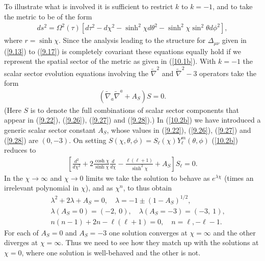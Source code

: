 \documentclass[aps,onecolumn,10pt]{revtex4}
\numberwithin{equation}{section}
\numberwithin{equation}{section}
\begin{document}
To illustrate what is involved it is sufficient to restrict $k$ to $k=-1$, and to take the metric to be of the form 
%
\begin{eqnarray}
ds^2=\Omega^2(\tau)\left[ d\tau^2-d\chi^2-\sinh^2\chi d\theta^2-\sinh^2\chi\sin^2\theta d\phi^2\right],
\label{10.1b}
\end{eqnarray}
%
where $r=\sinh \chi$. Since the analysis leading to the structure for $\Delta_{\mu\nu}$ given in (\ref{9.13}) to (\ref{9.17}) is completely covariant these equations equally hold if we represent the spatial sector of the metric as given in (\ref{10.1b}). With $k=-1$ the scalar sector evolution equations involving the $\tilde{\nabla}^2$ and $\tilde{\nabla}^2-3$ operators take the form
%
\begin{eqnarray}
(\tilde{\nabla}_a\tilde{\nabla}^a+A_S)S=0.
\label{10.2b}
\end{eqnarray}
%
(Here $S$ is to denote the full combinations of scalar sector  components that appear in  (\ref{9.22}), (\ref{9.26}), (\ref{9.27}) and (\ref{9.28}).)  In (\ref{10.2b}) we have introduced a generic scalar sector constant $A_S$, whose values in  (\ref{9.22}), (\ref{9.26}), (\ref{9.27}) and (\ref{9.28})  are $(0,-3)$. On setting $S(\chi,\theta,\phi)=S_{\ell}(\chi)Y^m_{\ell}(\theta,\phi)$ (\ref{10.2b}) reduces to 
%  
\begin{eqnarray}
 \left[\frac{d^2}{d\chi^2}+2\frac{\cosh\chi }{\sinh\chi}\frac{d }{ d\chi}
-\frac{\ell(\ell+1)}{ \sinh^2\chi}+A_S\right]S_{\ell}=0.
\label{10.3b}
\end{eqnarray}
%
In the  $\chi\rightarrow \infty$ and $\chi\rightarrow 0$ limits  we take the solution to behave as $e^{\lambda \chi}$ (times an irrelevant polynomial in $\chi$), and as $\chi^n$, to thus obtain
%
\begin{eqnarray}
&&\lambda^2+2\lambda+A_S=0,\quad \lambda=-1\pm(1-A_S)^{1/2},
\nonumber\\
&&\lambda(A_S=0)=(-2,~0),\quad \lambda(A_S=-3)=(-3,~1),
\nonumber\\
&&n(n-1)+2n-\ell(\ell+1)=0,\quad n=\ell,-\ell-1.
\label{10.4b}
\end{eqnarray}
%
For each of $A_S=0$ and  $A_S=-3$ one solution converges at $\chi=\infty$ and the other diverges at $\chi=\infty$. Thus we need to see how they match up with the solutions at $\chi=0$, where one solution is well-behaved and the other is not. 
\end{document}

